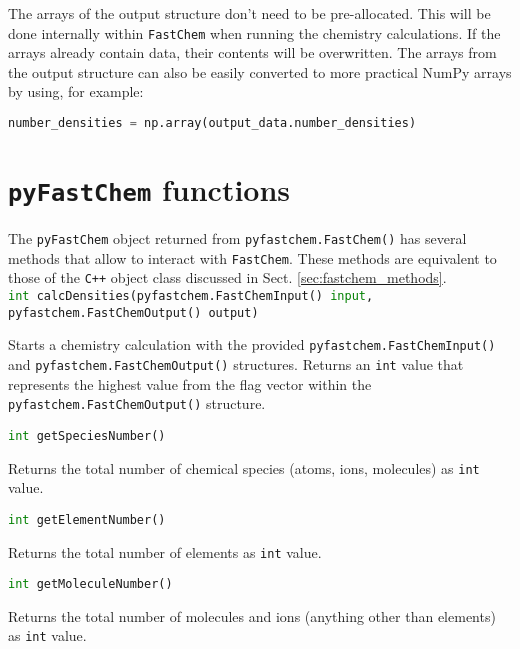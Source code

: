 \documentclass[numbers=noenddot]{aux/fcmanual}
\newcommand{\fc}{\texttt{FastChem}\xspace}
\newcommand{\pfc}{\texttt{pyFastChem}\xspace}
\newcommand{\cpp}{\ttt{C++}\xspace}
\newcommand{\ttt}[1]{\texttt {#1}}
\begin{document}
\bigbreak

The arrays of the output structure don't need to be pre-allocated. This will be done internally within \fc when running the chemistry calculations. If the arrays already contain data, their contents will be overwritten. The arrays from the output structure can also be easily converted to more practical NumPy arrays by using, for example:
\begin{lstlisting}[language=Python]
  number_densities = np.array(output_data.number_densities)
\end{lstlisting} 


\section{\pfc functions}
\label{sec:pfc_methods}

The \pfc object returned from \lstinline[language=Python]!pyfastchem.FastChem()! has several methods that allow to interact with \fc. These methods are equivalent to those of the \cpp object class discussed in Sect. \ref{sec:fastchem_methods}.\\

\lstinline[language=Python]!int calcDensities(pyfastchem.FastChemInput() input, pyfastchem.FastChemOutput() output)!
\begin{addmargin}[25pt]{0pt}
	Starts a chemistry calculation with the provided \lstinline!pyfastchem.FastChemInput()! and \lstinline!pyfastchem.FastChemOutput()! structures. Returns an \lstinline!int! value that represents the highest value from the flag vector within the \lstinline!pyfastchem.FastChemOutput()! structure.
\end{addmargin}

\bigbreak

\lstinline[language=Python]!int getSpeciesNumber()!
\begin{addmargin}[25pt]{0pt}
	Returns the total number of chemical species (atoms, ions, molecules) as \lstinline!int! value.
\end{addmargin}

\bigbreak

\lstinline[language=Python]!int getElementNumber()!
\begin{addmargin}[25pt]{0pt}
	Returns the total number of elements as \lstinline!int! value.
\end{addmargin}

\bigbreak

\lstinline[language=Python]!int getMoleculeNumber()!
\begin{addmargin}[25pt]{0pt}
	Returns the total number of molecules and ions (anything other than elements) as \lstinline!int! value.
\end{addmargin}
\end{document}
